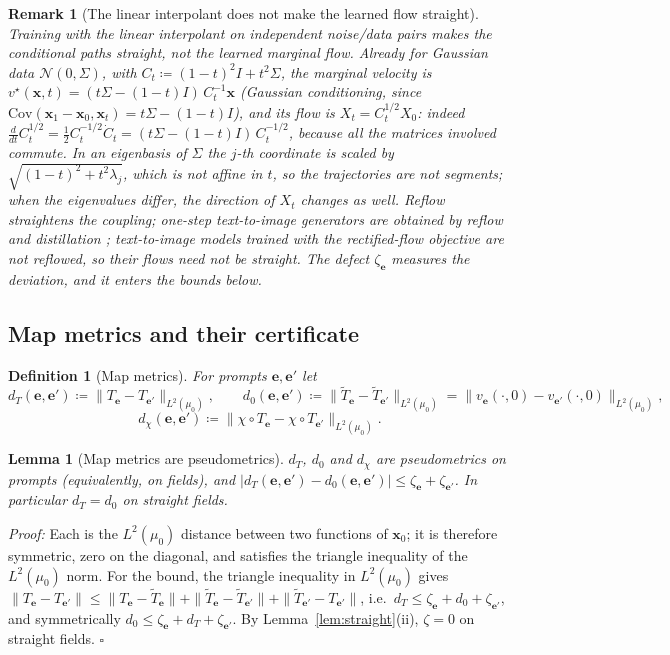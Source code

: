 \documentclass{article}
\newcommand{\bx}{\mathbf{x}}
\newcommand{\be}{\mathbf{e}}                       %
\theoremstyle{plain}
\newtheorem{lemma}{Lemma}
\newtheorem{definition}{Definition}
\newtheorem{remark}{Remark}
\begin{document}
\begin{remark}[The linear interpolant does not make the learned flow straight]\label{rem:not_straight}
Training with the linear interpolant on independent noise/data pairs makes the
\emph{conditional} paths straight, not the learned marginal flow. Already for Gaussian data
$\mathcal{N}(0,\Sigma)$, with $C_t\coloneqq(1-t)^2I+t^2\Sigma$, the marginal velocity is
$v^\star(\bx,t)=(t\Sigma-(1-t)I)\,C_t^{-1}\bx$ (Gaussian conditioning, since
$\mathrm{Cov}(\bx_1-\bx_0,\bx_t)=t\Sigma-(1-t)I$), and its flow is $X_t=C_t^{1/2}X_0$: indeed
$\frac{d}{dt}C_t^{1/2}=\frac12C_t^{-1/2}\dot C_t=(t\Sigma-(1-t)I)\,C_t^{-1/2}$, because all the
matrices involved commute. In an eigenbasis of $\Sigma$ the $j$-th coordinate is scaled by
$\sqrt{(1-t)^2+t^2\lambda_j}$, which is not affine in $t$, so the trajectories are not segments;
when the eigenvalues differ, the direction of $X_t$ changes as well. Reflow \citep{liu2023flow}
straightens the coupling; one-step text-to-image generators are obtained by reflow and
distillation \citep{liu2024instaflow}; text-to-image models trained with the rectified-flow
objective \citep{esser2024scaling} are not reflowed, so their flows need not be straight. The defect
$\zeta_{\be}$ measures the deviation, and it enters the bounds below.
\end{remark}

\subsection{Map metrics and their certificate}\label{subsec:map_metrics}

\begin{definition}[Map metrics]\label{def:map_metrics}
For prompts $\be,\be'$ let
\[
  d_T(\be,\be')\coloneqq\|T_{\be}-T_{\be'}\|_{L^2(\mu_0)},\qquad
  d_0(\be,\be')\coloneqq\|\tilde T_{\be}-\tilde T_{\be'}\|_{L^2(\mu_0)}=\|v_{\be}(\cdot,0)-v_{\be'}(\cdot,0)\|_{L^2(\mu_0)},
\]
\[
  d_\chi(\be,\be')\coloneqq\|\chi\circ T_{\be}-\chi\circ T_{\be'}\|_{L^2(\mu_0)} .
\]
\end{definition}

\begin{lemma}[Map metrics are pseudometrics]\label{lem:map_metrics}
$d_T$, $d_0$ and $d_\chi$ are pseudometrics on prompts (equivalently, on fields), and
$|d_T(\be,\be')-d_0(\be,\be')|\leq\zeta_{\be}+\zeta_{\be'}$. In particular $d_T=d_0$ on straight fields.
\end{lemma}
\textit{Proof:}
Each is the $L^2(\mu_0)$ distance between two functions of $\bx_0$; it is therefore symmetric,
zero on the diagonal, and satisfies the triangle inequality of the $L^2(\mu_0)$ norm. For the
bound, the triangle inequality in $L^2(\mu_0)$ gives
$\|T_{\be}-T_{\be'}\|\leq\|T_{\be}-\tilde T_{\be}\|+\|\tilde T_{\be}-\tilde T_{\be'}\|+\|\tilde T_{\be'}-T_{\be'}\|$, i.e.\
$d_T\leq\zeta_{\be}+d_0+\zeta_{\be'}$, and symmetrically $d_0\leq\zeta_{\be}+d_T+\zeta_{\be'}$. By
Lemma~\ref{lem:straight}(ii), $\zeta=0$ on straight fields. \hfill $\square$
\end{document}
